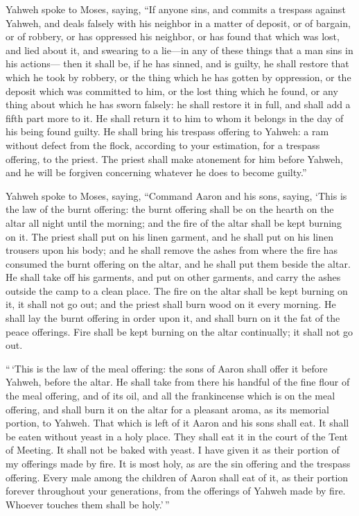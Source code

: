 Yahweh spoke to Moses, saying,  ``If anyone
sins, and commits a trespass against Yahweh, and deals falsely with his
neighbor in a matter of deposit, or of bargain, or of robbery, or has
oppressed his neighbor,  or has found that which was lost,
and lied about it, and swearing to a lie---in any of these things that a
man sins in his actions---  then it shall be, if he has
sinned, and is guilty, he shall restore that which he took by robbery,
or the thing which he has gotten by oppression, or the deposit which was
committed to him, or the lost thing which he found,  or any
thing about which he has sworn falsely: he shall restore it in full, and
shall add a fifth part more to it. He shall return it to him to whom it
belongs in the day of his being found guilty.  He shall
bring his trespass offering to Yahweh: a ram without defect from the
flock, according to your estimation, for a trespass offering, to the
priest.  The priest shall make atonement for him before
Yahweh, and he will be forgiven concerning whatever he does to become
guilty.''

 Yahweh spoke to Moses, saying,  ``Command Aaron
and his sons, saying, `This is the law of the burnt offering: the burnt
offering shall be on the hearth on the altar all night until the
morning; and the fire of the altar shall be kept burning on it.
 The priest shall put on his linen garment, and he shall
put on his linen trousers upon his body; and he shall remove the ashes
from where the fire has consumed the burnt offering on the altar, and he
shall put them beside the altar.  He shall take off his
garments, and put on other garments, and carry the ashes outside the
camp to a clean place.  The fire on the altar shall be kept
burning on it, it shall not go out; and the priest shall burn wood on it
every morning. He shall lay the burnt offering in order upon it, and
shall burn on it the fat of the peace offerings.  Fire
shall be kept burning on the altar continually; it shall not go out.

 ``\,`This is the law of the meal offering: the sons of
Aaron shall offer it before Yahweh, before the altar.  He
shall take from there his handful of the fine flour of the meal
offering, and of its oil, and all the frankincense which is on the meal
offering, and shall burn it on the altar for a pleasant aroma, as its
memorial portion, to Yahweh.  That which is left of it
Aaron and his sons shall eat. It shall be eaten without yeast in a holy
place. They shall eat it in the court of the Tent of Meeting.
 It shall not be baked with yeast. I have given it as their
portion of my offerings made by fire. It is most holy, as are the sin
offering and the trespass offering.  Every male among the
children of Aaron shall eat of it, as their portion forever throughout
your generations, from the offerings of Yahweh made by fire. Whoever
touches them shall be holy.'\,''

